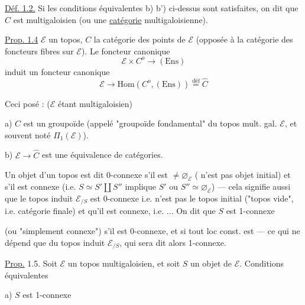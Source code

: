 \uline{Déf. 1.2.} Si les conditions équivalentes b) b') ci-dessus
sont satisfaites, on dit que \(C\)
est   
multigaloisien (ou une \uline{catégorie} multigaloisienne).


\uline{Prop. 1.4}  \(\mathcal E\) un topos,
\(C\) la catégorie des points de \(\mathcal E\) (opposée à la
catégorie des foncteurs fibres sur \(\mathcal E\)). Le foncteur
canonique
\[
\mathcal E\times C^o\longrightarrow(\mathrm{Ens})
\]
induit un foncteur canonique
\[
\mathcal E\longrightarrow\mathrm{Hom}(C^o,(\mathrm{Ens}))
\overset{\mathrm{déf}}{=}\widehat C
\]

Ceci posé : (\(\mathcal E\) étant multigaloisien)

a) \(C\) est un groupoïde (appelé "groupoïde fondamental" du topos
mult. gal. \(\mathcal E\), et souvent noté
\(\Pi_1(\mathcal E)\)).

b) \(\mathcal E\longrightarrow\widehat C\) est une équivalence
de catégories.

Un objet  d'un topos 
est dit 0-connexe s'il est \(\ne\varnothing_{\mathcal E}\)
( n'est pas objet initial) et s'il est connexe
(i.e. \(S\simeq S'\amalg S''\) implique
\(S'\) ou \(S''\simeq\varnothing_{\mathcal E}\)) --- cela signifie
aussi que le topos induit \(\mathcal E_{/S}\) est 0-connexe
i.e. n'est pas le topos initial ("topos vide", i.e.
 catégorie finale) et qu'il est connexe,
i.e. ... On dit que \(S\) est 1-connexe


(ou "simplement connexe") s'il est 0-connexe, et si tout
loc const.  est 
--- ce qui ne dépend  que du topos induit
\(\mathcal E_{/S}\), qui sera dit alors 1-connexe.

\uline{Prop.} 1.5. Soit \(\mathcal E\) un topos multigaloisien,
et soit \(S\) un objet de \(\mathcal E\). Conditions équivalentes

a) \(S\) est 1-connexe

